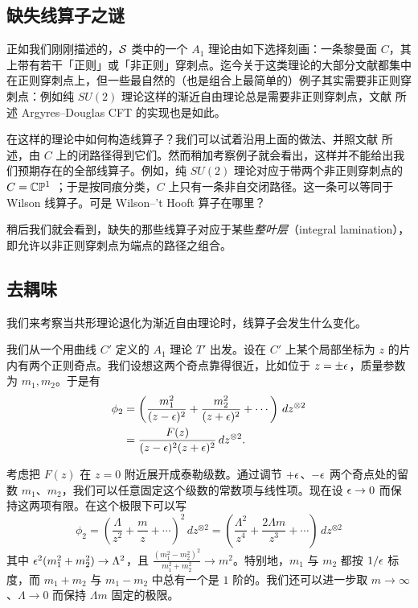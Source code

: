 \subsection{缺失线算子之谜}
\label{sec:missing}

正如我们刚刚描述的，$\mathcal{S}$ 类中的一个 $A_1$ 理论由如下选择刻画：一条黎曼面 $C$，其上带有若干「正则」或「非正则」穿刺点。迄今关于这类理论的大部分文献都集中在正则穿刺点上，但一些最自然的（也是组合上最简单的）例子其实需要非正则穿刺点：例如纯 $SU(2)$ 理论这样的渐近自由理论总是需要非正则穿刺点，文献 \cite{Gaiotto:2009hg} 所述 Argyres--Douglas CFT 的实现也是如此。

在这样的理论中如何构造线算子？我们可以试着沿用上面的做法、并照文献 \cite{Drukker:2009tz} 所述，由 $C$ 上的闭路径得到它们。然而稍加考察例子就会看出，这样并不能给出我们预期存在的全部线算子。例如，纯 $SU(2)$ 理论对应于带两个非正则穿刺点的 $C = \mathbb{C}\mathbb{P}^1$ \cite{Gaiotto:2009hg}；于是按同痕分类，$C$ 上只有一条非自交闭路径。这一条可以等同于 Wilson 线算子。可是 Wilson--'t Hooft 算子在哪里？

稍后我们就会看到，缺失的那些线算子对应于某些\emph{整叶层}（integral lamination），即允许以非正则穿刺点为端点的路径之组合。

\subsection{去耦味}
\label{subsec:Decouple-Flavor}

我们来考察当共形理论退化为渐近自由理论时，线算子会发生什么变化。

我们从一个用曲线 $C'$ 定义的 $A_1$ 理论 $T'$ 出发。设在 $C'$ 上某个局部坐标为 $z$ 的片内有两个正则奇点。我们设想这两个奇点靠得很近，比如位于 $z = \pm \epsilon$，质量参数为 $m_1, m_2$。于是有
\begin{equation}
\begin{split}
\phi_2 & = \left( \frac{m_1^2}{(z-\epsilon)^2} + \frac{m_2^2}{(z+\epsilon)^2} + \cdots \right) \, dz^{\otimes 2}\\
& = \frac{F(z)}{(z - \epsilon)^2 (z + \epsilon)^2} \, dz^{\otimes 2}.
\end{split}
\end{equation}

考虑把 $F(z)$ 在 $z = 0$ 附近展开成泰勒级数。通过调节 $+\epsilon$、$-\epsilon$ 两个奇点处的留数 $m_1$、$m_2$，我们可以任意固定这个级数的常数项与线性项。现在设 $\epsilon \to 0$ 而保持这两项有限。在这个极限下可以写
\begin{equation} \label{eq:limit-q}
\phi_2 = \left(\frac{\Lambda}{z^2} + \frac{m}{z} + \cdots\right)^2  \, dz^{\otimes 2}
= \left( \frac{\Lambda^2}{z^4} + \frac{2 \Lambda m}{z^3} + \cdots\right)  \, dz^{\otimes 2}
\end{equation}
其中 $\epsilon^2(m_1^2 + m_2^2) \to \Lambda^2$，且 $\frac{(m_1^2 - m_2^2)^2}{m_1^2 + m_2^2} \to m^2$。特别地，$m_1$ 与 $m_2$ 都按 $1/\epsilon$ 标度，而 $m_1 + m_2$ 与 $m_1 - m_2$ 中总有一个是 $1$ 阶的。我们还可以进一步取 $m \to \infty$、$\Lambda \to 0$ 而保持 $\Lambda m$ 固定的极限。


